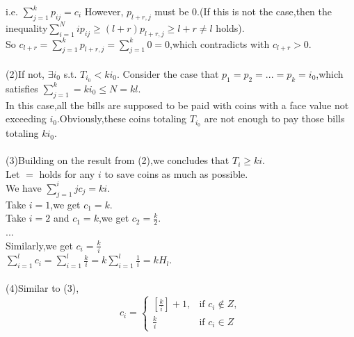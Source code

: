 \documentclass{article}
\begin{document}
i.e. $\sum_{j=1}^kp_{ij}=c_i$
However, $p_{l+r,j}$ must be $0$.(If this is not the case,then the inequality$\sum_{i=1}^{N}ip_{ij}\geq (l+r)p_{l+r,j}\geq l+r\neq l$ holds).\\
So $c_{l+r}=\sum_{j=1}^k {p_{l+r,j}}=\sum_{j=1}^k 0 = 0$,which contradicts with $c_{l+r}>0$.\\
\\
(2)If not, $\exists i_0$ s.t. $T_{i_0}<ki_0$.
Consider the case that $p_1=p_2=...=p_k=i_0$,which satisfies $\sum_{j=1}^k=ki_0\leq N=kl$.\\
In this case,all the bills are supposed to be paid with coins with a face value not exceeding $i_0$.Obviously,these coins totaling $T_{i_0}$ are not enough to pay those bills totaling $ki_0$.\\
\\
(3)Building on the result from (2),we concludes that $T_i\geq ki$.\\
Let $=$ holds for any $i$ to save coins as much as possible.\\
We have $\sum_{j=1}^i jc_j=ki$.\\
Take $i=1$,we get $c_1=k$.\\
Take $i=2$ and $c_1=k$,we get $c_2 = \frac{k}{2}$.\\
...\\
Similarly,we get $c_i=\frac{k}{i}$\\
$\sum_{i=1}^lc_i=\sum_{i=1}^l \frac{k}{i}=k\sum_{i=1}^l\frac{1}{i}=kH_l$.\\
\\
(4)Similar to (3),\\
\[ c_i= \begin{cases} [\frac{k}{i}]+1, & \text{if } c_i \notin Z ,\\\frac{k}{i}  & \text{if } c_i \in Z \end{cases} \]
\end{document}
